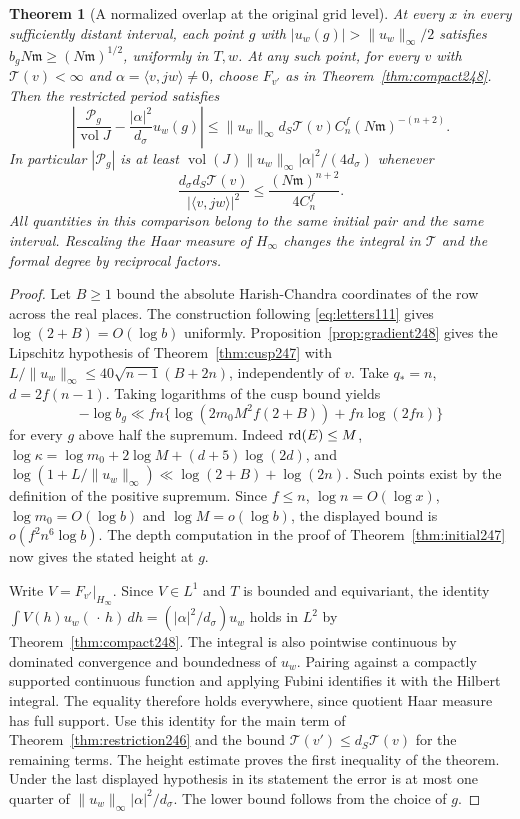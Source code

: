 \documentclass[a4paper,11pt]{article}
\newtheorem{theorem}[proposition]{Theorem}
\theoremstyle{definition}
\theoremstyle{remark}
\numberwithin{equation}{section}
\begin{document}
\begin{theorem}[A normalized overlap at the original grid level]
\label{thm:ratio248}
At every \(x\) in every sufficiently distant interval, each point \(g\) with
\(|u_w(g)|>\|u_w\|_\infty/2\) satisfies
\(b_gN\mathfrak m\ge(N\mathfrak m)^{1/2}\), uniformly in \(T,w\).
At any such point, for every \(v\) with \(\mathcal T(v)<\infty\) and
\(\alpha=\langle v,jw\rangle\ne0\), choose \(F_{v'}\) as in
Theorem~\ref{thm:compact248}. Then the restricted period satisfies
\[
 \left|\frac{\mathcal P_g}{\operatorname{vol}J}
            -\frac{|\alpha|^2}{d_\sigma}u_w(g)\right|
 \le \|u_w\|_\infty d_S\mathcal T(v) C_n^f
                       (N\mathfrak m)^{-(n+2)} .
\]
In particular \( |\mathcal P_g| \) is at least
\(\operatorname{vol}(J)\|u_w\|_\infty |\alpha|^2/(4d_\sigma)\)
whenever
\[
    \frac{d_\sigma d_S\mathcal T(v)}{|\langle v,jw\rangle|^2}
                     \le \frac{(N\mathfrak m)^{n+2}}{4 C_n^f} .
\]
All quantities in this comparison belong to the same initial pair
and the same interval. Rescaling the Haar measure of \(H_\infty\)
changes the integral in \(\mathcal T\) and the formal degree by
reciprocal factors.
\end{theorem}
\begin{proof}
Let \(B\ge1\) bound the absolute Harish-Chandra coordinates of the
row across the real places. The construction following
\eqref{eq:letters111} gives \(\log(2+B)=O(\log b)\) uniformly.
Proposition~\ref{prop:gradient248} gives the Lipschitz hypothesis
of Theorem~\ref{thm:cusp247} with \(L/\|u_w\|_\infty\le
40\sqrt{n-1}(B+2n)\), independently of \(v\). Take \(q_*=n\),
\(d=2f(n-1)\). Taking logarithms of the cusp bound yields
\[
 -\log b_g\ll f n\{\log(2m_0 M^2 f(2+B))+fn\log(2fn)\}
\]
for every \(g\) above half the supremum. Indeed
\({\rm rd}(E)\le M\), \(\log\kappa=\log m_0+2\log M+(d+5)\log(2d)\),
and \(\log(1+L/\|u_w\|_\infty)\ll\log(2+B)+\log(2n)\).
Such points exist by the definition of the positive supremum.
Since \(f\le n\), \(\log n=O(\log x)\), \(\log m_0=O(\log b)\) and
\(\log M=o(\log b)\), the displayed bound is
\(o(f^2 n^6\log b)\). The depth computation in the proof of
Theorem~\ref{thm:initial247} now gives the stated height at \(g\).

Write \(V=F_{v'}|_{H_\infty}\). Since \(V\in L^1\) and \(T\) is
bounded and equivariant, the identity
\(\int V(h)u_w(\,\cdot\,h)\,dh=(|\alpha|^2/d_\sigma)u_w\) holds
in \(L^2\) by Theorem~\ref{thm:compact248}. The integral is also
pointwise continuous by dominated convergence and boundedness of
\(u_w\). Pairing against a compactly supported continuous function
and applying Fubini identifies it with the Hilbert integral. The
equality therefore holds everywhere, since quotient Haar measure
has full support. Use this identity for the main term of
Theorem~\ref{thm:restriction246} and the bound
\(\mathcal T(v')\le d_S\mathcal T(v)\) for the remaining terms.
The height estimate proves the first inequality of the theorem.
Under the last displayed hypothesis in its statement the error
is at most one quarter of \(\|u_w\|_\infty |\alpha|^2/d_\sigma\).
The lower bound follows from the choice of \(g\).
\end{proof}
\end{document}
